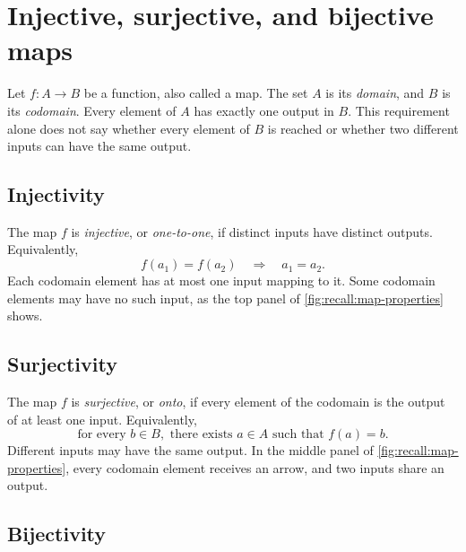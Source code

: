 \section{Injective, surjective, and bijective maps}
\label{sec:appendix:map-properties}

Let \(f:A\to B\) be a function, also called a map. The set \(A\) is its
\emph{domain}, and \(B\) is its \emph{codomain}. Every element of \(A\)
has exactly one output in \(B\). This requirement alone does not say
whether every element of \(B\) is reached or whether two different
inputs can have the same output.

\subsection{Injectivity}

The map \(f\) is \emph{injective}, or \emph{one-to-one}, if distinct
inputs have distinct outputs. Equivalently,
\[
  f(a_1)=f(a_2)\quad\Longrightarrow\quad a_1=a_2.
\]
Each codomain element has at most one input mapping to it. Some
codomain elements may have no such input, as the top panel of
\autoref{fig:recall:map-properties} shows.

\subsection{Surjectivity}

The map \(f\) is \emph{surjective}, or \emph{onto}, if every element
of the codomain is the output of at least one input. Equivalently,
\[
  \text{for every }b\in B,\text{ there exists }a\in A
  \text{ such that }f(a)=b.
\]
Different inputs may have the same output. In the middle panel of
\autoref{fig:recall:map-properties}, every codomain element receives
an arrow, and two inputs share an output.

\subsection{Bijectivity}

